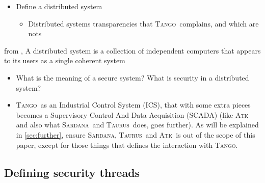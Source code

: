 \documentclass[10pt,a4paper,twoside]{llncs}
\newcommand{\tango}{\textsc{Tango}}
\newcommand{\sardana}{\textsc{Sardana}}
\newcommand{\taurus}{\textsc{Taurus}}
\newcommand{\atk}{\textsc{Atk}}
\begin{document}
\begin{itemize}
    \item Define a distributed system
    \begin{itemize}
        \item Distributed systems transparencies \cite{TanenbaumDistr} that \tango\, complains, and which are nots
    \end{itemize}
    \end{itemize}%
    \begin{definition}
        from \cite{TanenbaumDistr}, A distributed system is a collection of independent computers that appears to its users as a single coherent system
    \end{definition}
    \begin{figure}[h]
    \end{figure}
    \begin{itemize}%
    \item What is the meaning of a secure system? What is security in a distributed system?
    \item \tango\, as an Industrial Control System (ICS), that with some extra pieces becomes a Supervisory Control And Data Acquisition (SCADA) (like \atk\, and also what \sardana\, and \taurus\, does, goes further). As will be explained in \ref{sec:further}, ensure \sardana, \taurus\, and \atk\, is out of the scope of this paper, except for those things that defines the interaction with \tango.
\end{itemize}

%
\subsection{Defining security threads \label{sec:securityThreads}}
\end{document}
